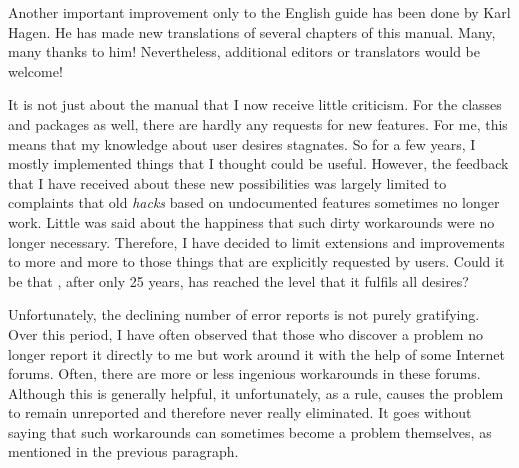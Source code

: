 Another important improvement only to the English guide has been done by Karl
Hagen. He has made new translations of several chapters of this manual. Many,
many thanks to him! Nevertheless, additional editors or translators would be
welcome!


It is not just about the manual that I now receive little criticism. For the
classes and packages as well, there are hardly any requests for new features.
For me, this means that my knowledge about user desires stagnates. So for a
few years, I mostly implemented things that I thought could be useful.
However, the feedback that I have received about these new possibilities was
largely limited to complaints that old \emph{hacks} based on undocumented
\KOMAScript{} features sometimes no longer work. Little was said about the
happiness that such dirty workarounds were no longer necessary. Therefore, I
have decided to limit extensions and improvements to \KOMAScript{} more and
more to those things that are explicitly requested by users. Could it be that
\KOMAScript{}, after only 25 years, has reached the level that it fulfils all
desires?

Unfortunately, the declining number of error reports is not purely gratifying.
Over this period, I have often observed that those who discover a problem no
longer report it directly to me but work around it with the help of some
Internet forums. Often, there are more or less ingenious workarounds in these
forums. Although this is generally helpful, it unfortunately, as a rule,
causes the problem to remain unreported and therefore never really eliminated.
It goes without saying that such workarounds can sometimes become a problem
themselves, as mentioned in the previous paragraph.

